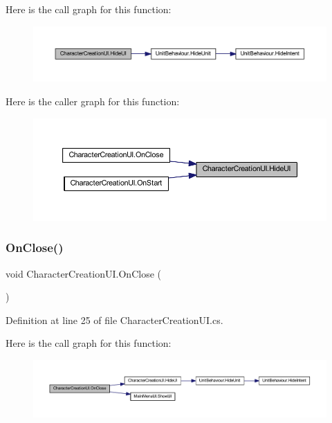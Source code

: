 Here is the call graph for this function\+:
\nopagebreak
\begin{figure}[H]
\begin{center}
\leavevmode
\includegraphics[width=350pt]{class_character_creation_u_i_a1724d7136e40f03376f720ec0ecb2d83_cgraph}
\end{center}
\end{figure}
Here is the caller graph for this function\+:
\nopagebreak
\begin{figure}[H]
\begin{center}
\leavevmode
\includegraphics[width=350pt]{class_character_creation_u_i_a1724d7136e40f03376f720ec0ecb2d83_icgraph}
\end{center}
\end{figure}
\mbox{\label{class_character_creation_u_i_a3a3792f0c251839acb08848c3bf0e6e0}} 
\subsubsection{\texorpdfstring{OnClose()}{OnClose()}}
{\footnotesize\ttfamily void Character\+Creation\+U\+I.\+On\+Close (\begin{DoxyParamCaption}{ }\end{DoxyParamCaption})}



Definition at line 25 of file Character\+Creation\+U\+I.\+cs.

Here is the call graph for this function\+:
\nopagebreak
\begin{figure}[H]
\begin{center}
\leavevmode
\includegraphics[width=350pt]{class_character_creation_u_i_a3a3792f0c251839acb08848c3bf0e6e0_cgraph}
\end{center}
\end{figure}
\mbox{\label{class_character_creation_u_i_a07db6ab68cff5c8d43ed3809e45efe0c}} 
